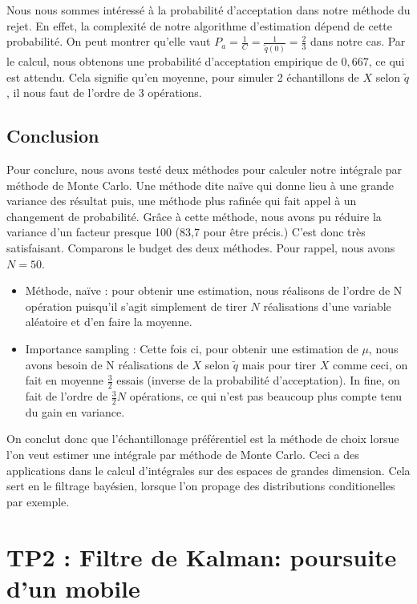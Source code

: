 \documentclass{article}
\begin{document}
Nous nous sommes intéressé à la probabilité d'acceptation dans notre méthode du rejet. En effet, la complexité de notre algorithme d'estimation dépend de cette probabilité.
On peut montrer qu'elle vaut
$P_{a}=\frac{1}{C}=\frac{1}{\tilde{q}(0)}= \frac{2}{3}$ dans notre cas. Par le calcul, nous obtenons une probabilité d'acceptation empirique de $0,667$, ce qui est attendu. Cela signifie qu'en moyenne, pour simuler 2 échantillons de $X$ selon
$\tilde{q}$, il nous faut de l'ordre de 3 opérations. 





\subsection{Conclusion}


Pour conclure, nous avons testé deux méthodes pour calculer notre intégrale par méthode de Monte Carlo. Une méthode dite naïve
qui donne lieu à une grande variance des résultat puis, une méthode plus rafinée qui fait
appel à un changement de probabilité. Grâce à cette méthode, nous avons pu réduire la variance d'un facteur presque 100 (83,7 pour être précis.) C'est donc très satisfaisant. Comparons le budget des deux méthodes. Pour rappel, nous avons
$N=50$. 
\begin{itemize}
   \item Méthode, naïve : pour obtenir une estimation, nous réalisons de l'ordre de N opération puisqu'il s'agit simplement de tirer $N$ réalisations d'une variable aléatoire et d'en faire la moyenne.
   \item Importance sampling : Cette fois ci, pour obtenir une estimation de $\mu$, nous avons besoin de N réalisations de $X$ selon $\tilde{q}$ mais pour tirer $X$ comme ceci, on fait en moyenne $\frac{3}{2}$ essais (inverse de la probabilité d'acceptation). In fine, on fait de l'ordre de $\frac{3}{2}N$ opérations, ce qui n'est pas beaucoup plus compte tenu du gain en variance. 
\end{itemize}

On conclut donc que l'échantillonage préférentiel est la méthode de 
choix lorsue l'on veut estimer une intégrale par méthode de Monte Carlo.
Ceci a des applications dans le calcul d'intégrales sur des espaces de grandes dimension. Cela sert en le filtrage bayésien, 
lorsque l'on propage des distributions conditionelles par exemple.

\clearpage

\section{TP2 : Filtre de Kalman: poursuite d'un mobile}
\end{document}

